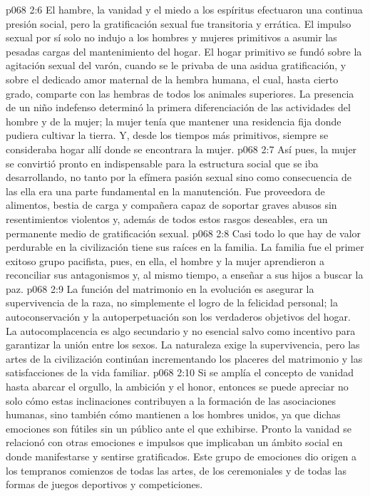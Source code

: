 \vs p068 2:6 El hambre, la vanidad y el miedo a los espíritus efectuaron una continua presión social, pero la gratificación sexual fue transitoria y errática. El impulso sexual por sí solo no indujo a los hombres y mujeres primitivos a asumir las pesadas cargas del mantenimiento del hogar. El hogar primitivo se fundó sobre la agitación sexual del varón, cuando se le privaba de una asidua gratificación, y sobre el dedicado amor maternal de la hembra humana, el cual, hasta cierto grado, comparte con las hembras de todos los animales superiores. La presencia de un niño indefenso determinó la primera diferenciación de las actividades del hombre y de la mujer; la mujer tenía que mantener una residencia fija donde pudiera cultivar la tierra. Y, desde los tiempos más primitivos, siempre se consideraba hogar allí donde se encontrara la mujer.
\vs p068 2:7 Así pues, la mujer se convirtió pronto en indispensable para la estructura social que se iba desarrollando, no tanto por la efímera pasión sexual sino como consecuencia de las  ella era una parte fundamental en la manutención. Fue proveedora de alimentos, bestia de carga y compañera capaz de soportar graves abusos sin resentimientos violentos y, además de todos estos rasgos deseables, era un permanente medio de gratificación sexual.
\vs p068 2:8 Casi todo lo que hay de valor perdurable en la civilización tiene sus raíces en la familia. La familia fue el primer exitoso grupo pacifista, pues, en ella, el hombre y la mujer aprendieron a reconciliar sus antagonismos y, al mismo tiempo, a enseñar a sus hijos a buscar la paz.
\vs p068 2:9 La función del matrimonio en la evolución es asegurar la supervivencia de la raza, no simplemente el logro de la felicidad personal; la autoconservación y la autoperpetuación son los verdaderos objetivos del hogar. La autocomplacencia es algo secundario y no esencial salvo como incentivo para garantizar la unión entre los sexos. La naturaleza exige la supervivencia, pero las artes de la civilización continúan incrementando los placeres del matrimonio y las satisfacciones de la vida familiar.
\vs p068 2:10 \pc Si se amplía el concepto de vanidad hasta abarcar el orgullo, la ambición y el honor, entonces se puede apreciar no solo cómo estas inclinaciones contribuyen a la formación de las asociaciones humanas, sino también cómo mantienen a los hombres unidos, ya que dichas emociones son fútiles sin un público ante el que exhibirse. Pronto la vanidad se relacionó con otras emociones e impulsos que implicaban un ámbito social en donde manifestarse y sentirse gratificados. Este grupo de emociones dio origen a los tempranos comienzos de todas las artes, de los ceremoniales y de todas las formas de juegos deportivos y competiciones.
